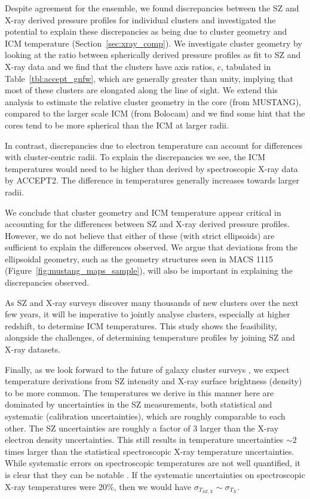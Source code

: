 \documentclass[iop,numberedappendix,apj]{emulateapj}
\begin{document}
Despite agreement for the ensemble, we found discrepancies between the SZ and X-ray derived
pressure profiles for individual clusters and investigated the potential to explain these discrepancies
as being due to cluster geometry and ICM temperature (Section~\ref{sec:xray_comp}). We investigate cluster
geometry by looking at the ratio between spherically derived pressure profiles as fit to SZ and X-ray data 
and we find that the clusters have axis ratios, $c$, tabulated in 
Table~\ref{tbl:accept_gnfw}, which are generally greater than unity, implying that most of these clusters are 
elongated along the line of sight. We extend this analysis to estimate the relative cluster geometry
in the core (from MUSTANG), compared to the larger scale ICM (from Bolocam) and we find some 
hint that the cores tend to be more spherical than the ICM at larger radii. 

In contrast, discrepancies due to electron temperature can account for differences with cluster-centric radii.
To explain the discrepancies we see, the ICM temperatures would need to be higher than derived by 
spectroscopic X-ray data by ACCEPT2. The difference in temperatures generally increases towards larger radii.

We conclude that cluster geometry and ICM temperature appear critical in accounting for the differences
between SZ and X-ray derived pressure profiles. However, we do not believe that either of these (with
strict ellipsoids) are sufficient to explain the differences observed. We argue that deviations from
the ellipsoidal geometry, such as the geometry structures seen in MACS 1115
(Figure~\ref{fig:mustang_maps_sample}), will also be important in explaining the discrepancies observed.

As SZ and X-ray surveys discover many thousands of new clusters over the next few years, it will be imperative
to jointly analyse clusters, especially at higher redshift, to determine ICM temperatures. This study shows
the feasibility, alongside the challenges, of determining temperature profiles by joining SZ and X-ray datasets.

Finally, as we look forward to the future of galaxy cluster surveys \citep[e.g. eRosita, SPT3G, ACTpol][]{
borm2014,benson2014,thornton2016}, we expect temperature derivations from SZ intensity and X-ray surface
brightness (density) to be more common. The temperatures we derive in this manner here are dominated by 
uncertainties in the SZ measurements, both statistical and systematic (calibration uncertainties), which are
roughly comparable to each other. The SZ uncertainties are roughly a factor of 3 larger than the X-ray
electron density uncertainties. This still results in temperature uncertainties $\sim 2$ times larger
than the statistical spectroscopic X-ray temperature uncertainties. While systematic errors on spectroscopic
temperatures are not well quantified, it is clear that they can be notable \citep[e.g.][]{donahue2014}.
If the systematic uncertainties on spectroscopic X-ray temperatures were 20\%, then we would have
$\sigma_{T_{SZ,X}} \sim \sigma_{T_X}$.
\end{document}
